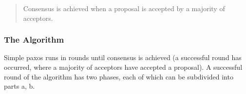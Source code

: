 \begin{quote}
Consensus is achieved when a proposal is accepted by a majority of acceptors.
\end{quote}


%

\subsubsection{The Algorithm}
Simple paxos runs in rounds until consensus is achieved (a successful round
has occurred, where a majority of acceptors have accepted a proposal).
A successful round of the algorithm has two phases, each of which can
be subdivided into parts a, b.


